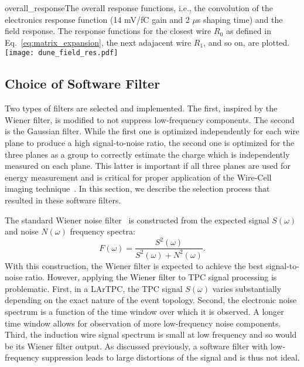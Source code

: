 \begin{cdrfigure}{overall_response}{The overall response functions, i.e., %
the convolution of the
electronics response function (14 mV/fC gain and 2 $\mu$s shaping time) 
and the field response. The response functions for the closest wire $R_0$ as defined in 
Eq.~\eqref{eq:matrix_expansion}, the next adajacent wire $R_1$, and so on, are plotted.
}
\texttt{[image: dune\_field\_res.pdf]}
\end{cdrfigure}

\subsection{Choice of Software Filter}

Two types of filters are selected and implemented.  The first, inspired by the Wiener filter,  
 is modified to not suppress low-frequency components.  The second is the 
Gaussian filter. While the first one is optimized independently for each wire plane to produce a 
high signal-to-noise ratio, the second one is optimized for the three planes as a group %
to correctly estimate the charge which is independently measured on each  plane. %
This latter is important if all three planes are used for energy measurement 
and is critical for proper application of the Wire-Cell imaging technique~\cite{wire-cell}.  
In this section, we describe the selection process that resulted in %
these software filters.

The standard Wiener noise filter~\cite{wiener} is constructed from the expected 
signal $S(\omega)$ and noise $N(\omega)$ frequency spectra:
\begin{equation}
F(\omega) = \frac{S^2(\omega)}{S^2(\omega) + N^2(\omega)}.
\end{equation}
With this construction, the Wiener filter is expected to achieve the best signal-to-noise ratio. 
However, applying the Wiener filter to TPC signal processing is problematic. 
First, in a LArTPC, the TPC signal $S(\omega)$ varies substantially
depending on the exact nature of the event topology.
Second, the electronic noise spectrum is a function of the time window
over which it is observed. A longer time window allows for observation
of more low-frequency noise components.
Third, the induction wire signal spectrum is small at low frequency
and so would be its Wiener filter output.  As discussed previously, 
a software filter with low-frequency suppression leads to large distortions 
of the signal and is thus not ideal.  

